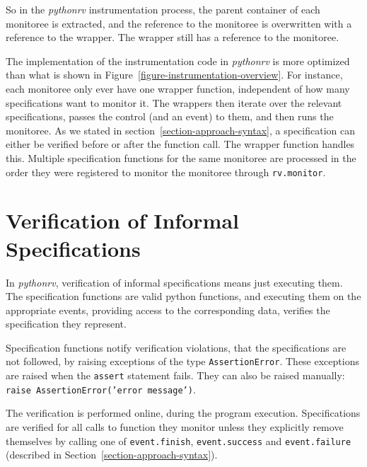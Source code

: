 
So in the \textit{pythonrv} instrumentation process, the parent container of
each monitoree is extracted, and the reference to the monitoree is overwritten
with a reference to the wrapper. The wrapper still has a reference to the
monitoree.

The implementation of the instrumentation code in \textit{pythonrv} is more
optimized than what is shown in Figure~\ref{figure-instrumentation-overview}.
For instance, each monitoree only ever have one wrapper function, independent
of how many specifications want to monitor it. The wrappers then iterate over
the relevant specifications, passes the control (and an event) to them, and
then runs the monitoree. As we stated in section~\ref{section-approach-syntax},
a specification can either be verified before or after the function call. The
wrapper function handles this. Multiple specification functions for the same
monitoree are processed in the order they were registered to monitor the
monitoree through \texttt{rv.monitor}.



\section{Verification of Informal Specifications}
\label{section-approach-verification}

In \textit{pythonrv}, verification of informal specifications means just
executing them. The specification functions are valid python functions, and
executing them on the appropriate events, providing access to the corresponding
data, verifies the specification they represent.

Specification functions notify verification violations, that the specifications
are not followed, by raising exceptions of the type \texttt{AssertionError}.
These exceptions are raised when the \texttt{assert} statement fails. They can
also be raised manually: \texttt{raise AssertionError('error message')}.

The verification is performed online, during the program execution.
Specifications are verified for all calls to function they monitor unless they
explicitly remove themselves by calling one of \texttt{event.finish},
\texttt{event.success} and \texttt{event.failure} (described in
Section~\ref{section-approach-syntax}).

